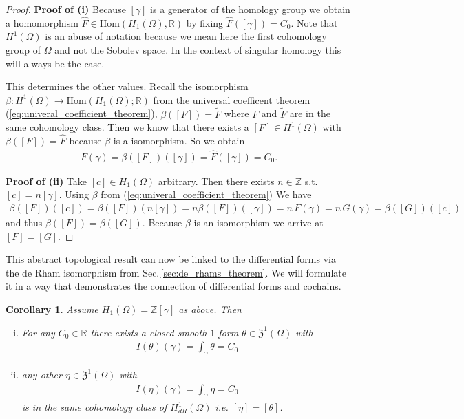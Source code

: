 \documentclass[12pt,a4paper]{article}
\numberwithin{equation}{subsection}
\numberwithin{lemma}{subsection}
\newtheorem{corollary}[lemma]{Corollary}
\theoremstyle{definition}
\newcommand{\integers}{\mathbb{Z}}
\newcommand{\real}{\mathbb{R}}
\begin{document}
\begin{proof}
    \textbf{Proof of (i)} %
    Because $[\gamma]$ is a generator of the homology group we  obtain a 
    homomorphism $\hat{F} \in \text{Hom}(H_1(\Omega),\real)$ by fixing
    $\hat{F}([\gamma]) = C_0$. Note that $H^1(\Omega)$ is an abuse of notation 
    because we mean here the first cohomology group of $\Omega$ and not the 
    Sobolev space. In the context of singular homology this will always be the
    case.
    
    This determines the other values.
    Recall the isomorphism $\beta : H^1(\Omega) \rightarrow 
    \text{Hom}(H_1(\Omega);\real)$ from the universal coefficent theorem 
    (\ref{eq:univeral_coefficient_theorem}), $\beta([F]) = \tilde{F}$ 
    where $F$ and $\tilde{F}$ are in the same cohomology class.
    Then we know that there exists
    a $[F] \in H^1(\Omega)$ with $\beta([F]) = \hat{F}$ because $\beta$ is a 
    isomorphism. So we obtain
    \begin{align*}
        F(\gamma) = \beta([F])([\gamma]) = \hat{F}([\gamma]) = C_0.
    \end{align*}

    \textbf{Proof of (ii)} %
    Take $[c] \in H_1(\Omega)$ arbitrary. 
    Then there exists  $n \in \integers$ s.t.
    $[c] = n [\gamma]$.
    Using $\beta$ from (\ref{eq:univeral_coefficient_theorem})
    We have
    \begin{align*}
        \beta([F])([c]) = \beta([F])(n [\gamma]) 
        = n \beta([F])([\gamma]) = n \, F(\gamma) = n \, G(\gamma) = 
        \beta([G])([c])
    \end{align*}
    and thus $\beta([F]) = \beta([G])$. Because $\beta$ is an isomorphism
    we arrive at $[F] = [G]$.
\end{proof}
This abstract topological result can now be linked to the differential 
forms via the de Rham isomorphism from Sec.\,\ref{sec:de_rhams_theorem}. 
We will formulate it in a way 
that demonstrates the connection of differential forms and cochains.
\begin{corollary}\label{cor:existence_uniqueness_1form}
    Assume $H_1(\Omega) = \integers [\gamma]$ as above. Then
    \begin{enumerate}[(i)]
        \item For any $C_0 \in \real$ there exists a closed smooth $1$-form 
            $\theta \in \mathfrak{Z}^1(\Omega)$ with 
            \begin{align*}
                I(\theta)(\gamma) = \int_\gamma \theta = C_0
            \end{align*}
        \item any other $\eta \in \mathfrak{Z}^1(\Omega)$ with 
            \begin{align*}
                I(\eta)(\gamma) = \int_\gamma \eta = C_0
            \end{align*}
            is in the same cohomology class of $H_{dR}^1(\Omega)$ 
            i.e. $[\eta] = [\theta]$.
    \end{enumerate}
\end{corollary}
\end{document}
